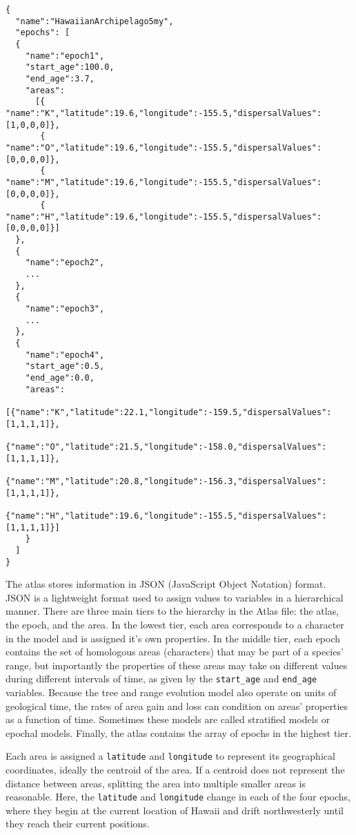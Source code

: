 \begin{framed}
\begin{lstlisting}[style=textboxSmall]
{
  "name":"HawaiianArchipelago5my",
  "epochs": [
  {
    "name":"epoch1",
    "start_age":100.0,
    "end_age":3.7,
    "areas":
      [{ "name":"K","latitude":19.6,"longitude":-155.5,"dispersalValues":[1,0,0,0]},
       { "name":"O","latitude":19.6,"longitude":-155.5,"dispersalValues":[0,0,0,0]},
       { "name":"M","latitude":19.6,"longitude":-155.5,"dispersalValues":[0,0,0,0]},
       { "name":"H","latitude":19.6,"longitude":-155.5,"dispersalValues":[0,0,0,0]}]
  },
  {
    "name":"epoch2",
    ...
  },
  {
    "name":"epoch3",
    ...
  },
  {
    "name":"epoch4",
    "start_age":0.5,
    "end_age":0.0,
    "areas":
      [{"name":"K","latitude":22.1,"longitude":-159.5,"dispersalValues":[1,1,1,1]},
       {"name":"O","latitude":21.5,"longitude":-158.0,"dispersalValues":[1,1,1,1]},
       {"name":"M","latitude":20.8,"longitude":-156.3,"dispersalValues":[1,1,1,1]},
       {"name":"H","latitude":19.6,"longitude":-155.5,"dispersalValues":[1,1,1,1]}]
    }
  ]
}
\end{lstlisting}
\end{framed}

The atlas stores information in JSON (JavaScript Object Notation) format.
JSON is a lightweight format used to assign values to variables in a hierarchical manner.
There are three main tiers to the hierarchy in the Atlas file: the atlas, the epoch, and the area.
In the lowest tier, each area corresponds to a character in the model and is assigned it's own properties.
In the middle tier, each epoch contains the set of homologous areas (characters) that may be part of a species' range, but importantly the properties of these areas may take on different values during different intervals of time, as given by the {\tt start\_age} and {\tt end\_age} variables.
Because the tree and range evolution model also operate on units of geological time, the rates of area gain and loss can condition on areas' properties as a function of time.
Sometimes these models are called stratified models or epochal models.
Finally, the atlas contains the array of epochs in the highest tier.

Each area is assigned a {\tt latitude} and {\tt longitude} to represent its geographical coordinates, ideally the centroid of the area.
If a centroid does not represent the distance between areas, splitting the area into multiple smaller areas is reasonable.
Here, the {\tt latitude} and {\tt longitude} change in each of the four epochs, where they begin at the current location of Hawaii and drift northwesterly until they reach their current positions.

